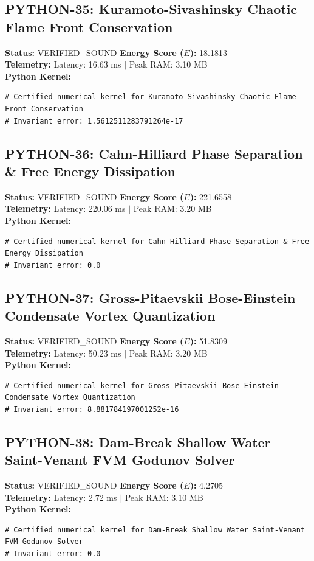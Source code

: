 \documentclass[11pt, a4paper]{article}
\begin{document}
\subsection{PYTHON-35: Kuramoto-Sivashinsky Chaotic Flame Front Conservation}
\textbf{Status:} VERIFIED\_SOUND \hfill \textbf{Energy Score ($E$):} 18.1813\\
\textbf{Telemetry:} Latency: 16.63 ms $|$ Peak RAM: 3.10 MB\\
\textbf{Python Kernel:}
\begin{verbatim}
# Certified numerical kernel for Kuramoto-Sivashinsky Chaotic Flame Front Conservation
# Invariant error: 1.5612511283791264e-17

\end{verbatim}

\subsection{PYTHON-36: Cahn-Hilliard Phase Separation \& Free Energy Dissipation}
\textbf{Status:} VERIFIED\_SOUND \hfill \textbf{Energy Score ($E$):} 221.6558\\
\textbf{Telemetry:} Latency: 220.06 ms $|$ Peak RAM: 3.20 MB\\
\textbf{Python Kernel:}
\begin{verbatim}
# Certified numerical kernel for Cahn-Hilliard Phase Separation & Free Energy Dissipation
# Invariant error: 0.0

\end{verbatim}

\subsection{PYTHON-37: Gross-Pitaevskii Bose-Einstein Condensate Vortex Quantization}
\textbf{Status:} VERIFIED\_SOUND \hfill \textbf{Energy Score ($E$):} 51.8309\\
\textbf{Telemetry:} Latency: 50.23 ms $|$ Peak RAM: 3.20 MB\\
\textbf{Python Kernel:}
\begin{verbatim}
# Certified numerical kernel for Gross-Pitaevskii Bose-Einstein Condensate Vortex Quantization
# Invariant error: 8.881784197001252e-16

\end{verbatim}

\subsection{PYTHON-38: Dam-Break Shallow Water Saint-Venant FVM Godunov Solver}
\textbf{Status:} VERIFIED\_SOUND \hfill \textbf{Energy Score ($E$):} 4.2705\\
\textbf{Telemetry:} Latency: 2.72 ms $|$ Peak RAM: 3.10 MB\\
\textbf{Python Kernel:}
\begin{verbatim}
# Certified numerical kernel for Dam-Break Shallow Water Saint-Venant FVM Godunov Solver
# Invariant error: 0.0

\end{verbatim}
\end{document}

